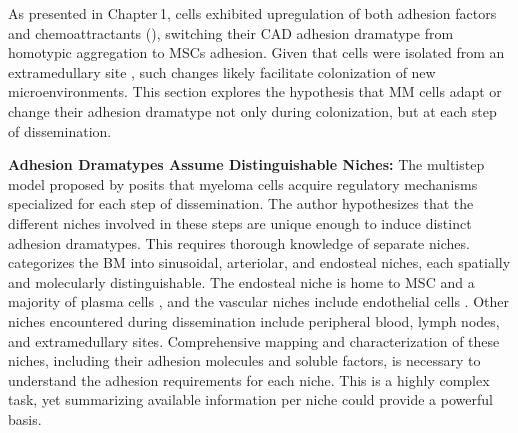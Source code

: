 \unnsubsection{\caddramatypetitle}%
\label{sec:discussion_caddadaptation}%
As presented in Chapter\,1, \MAina cells exhibited upregulation of both adhesion
factors and chemoattractants (), switching their \ac{CAD}
adhesion dramatype
from homotypic aggregation to \acp{MSC} adhesion. Given that \INA cells were
isolated from an extramedullary site 
\cite{burgerGp130RasMediated2001}, such changes likely facilitate colonization
of new microenvironments. This section explores the hypothesis that MM cells
adapt or change their adhesion dramatype not only during colonization, but at
each step of dissemination.


\textbf{Adhesion Dramatypes Assume Distinguishable Niches:} The multistep model
proposed by \citet{zeissigTumourDisseminationMultiple2020} posits that myeloma
cells acquire regulatory mechanisms specialized for each step of dissemination.
The author hypothesizes that the different niches involved in these steps are
unique enough to induce distinct adhesion dramatypes. This requires thorough
knowledge of separate niches. \citet{granataBoneMarrowNiches2022} categorizes
the \ac{BM} into sinusoidal, arteriolar, and endosteal niches, each spatially
and molecularly distinguishable. The endosteal niche is home to \ac{MSC} and a
majority of plasma cells%
%
, and the vascular niches  include endothelial
cells \cite{zehentmeierStaticDynamicComponents2014,
      wilmoreHereThereAnywhere2017}. Other niches encountered during dissemination
include peripheral blood, lymph nodes, and extramedullary sites. Comprehensive
mapping and characterization of these niches, including their adhesion molecules
and soluble factors, is necessary to understand the adhesion requirements for
each niche. This is a highly complex task, yet summarizing available information
per niche could provide a powerful basis.


